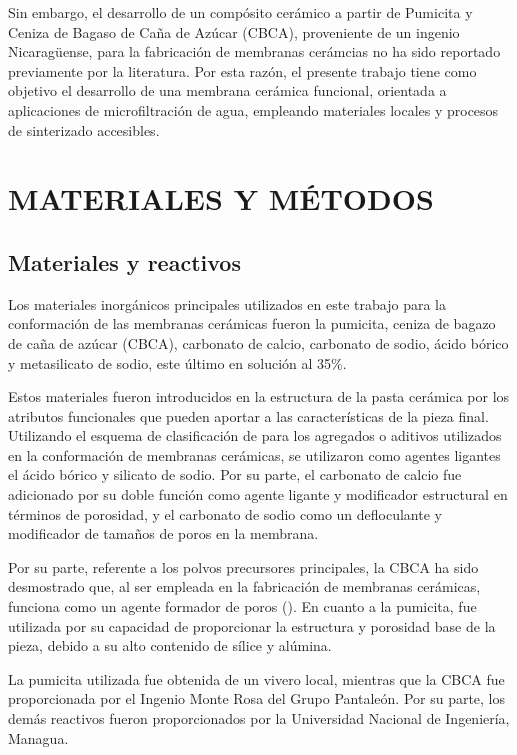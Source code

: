 \documentclass{article}
\begin{document}
Sin embargo, el desarrollo de un compósito cerámico a partir de Pumicita y Ceniza de Bagaso de Caña de Azúcar (CBCA), proveniente de un ingenio Nicaragüense, para la fabricación de membranas cerámcias no ha sido reportado previamente por la literatura. Por esta razón, el presente trabajo tiene como objetivo el desarrollo de una membrana cerámica funcional, orientada a aplicaciones de microfiltración de agua, empleando materiales locales y procesos de sinterizado accesibles. 


\newpage
\section{MATERIALES Y MÉTODOS}
\subsection{Materiales y reactivos}
Los materiales inorgánicos principales utilizados en este trabajo para la conformación de las membranas cerámicas fueron la pumicita, ceniza de bagazo de caña de azúcar (CBCA), carbonato de calcio, carbonato de sodio, ácido bórico y metasilicato de sodio, este último en solución al 35\%. 


Estos materiales fueron introducidos en la estructura de la pasta cerámica por los atributos funcionales que pueden aportar a las características de la pieza final. Utilizando el esquema de clasificación de \textcite{Benito2004} para los agregados o aditivos utilizados en la conformación de membranas cerámicas, se utilizaron como agentes ligantes el ácido bórico y silicato de sodio. Por su parte, el carbonato de calcio fue adicionado por su doble función como agente ligante y modificador estructural en términos de porosidad, y el carbonato de sodio como un defloculante y modificador de tamaños de poros en la membrana. 

Por su parte, referente a los polvos precursores principales, la CBCA ha sido desmostrado que, al ser empleada en la fabricación de membranas cerámicas, funciona como un agente formador de poros (\cite{Andrade2019}). En cuanto a la pumicita, fue utilizada por su capacidad de proporcionar la estructura y porosidad base de la pieza, debido a su alto contenido de sílice y alúmina.  

La pumicita utilizada fue obtenida de un vivero local, mientras que la CBCA fue proporcionada por el Ingenio Monte Rosa del Grupo Pantaleón. Por su parte, los demás reactivos fueron proporcionados por la Universidad Nacional de Ingeniería, Managua. 
\end{document}
